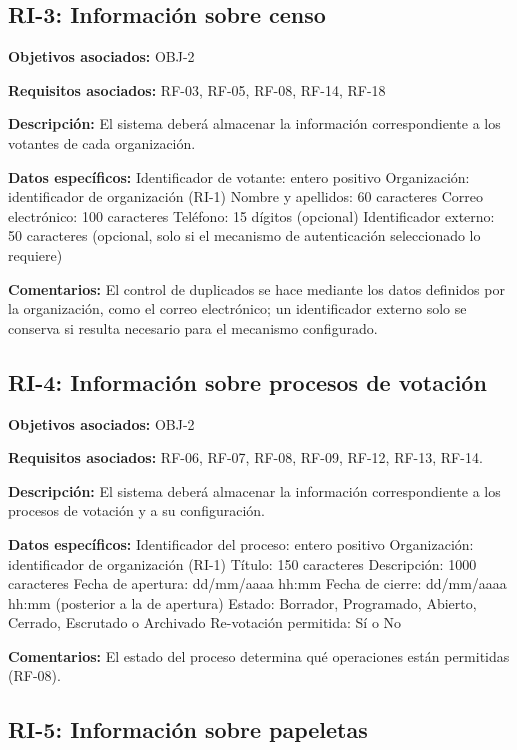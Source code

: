 \subsection{RI-3: Información sobre censo}

\textbf{Objetivos asociados:} OBJ-2\par
\textbf{Requisitos asociados:} RF-03, RF-05, RF-08, RF-14, RF-18\par
\textbf{Descripción:} El sistema deberá almacenar la información correspondiente a los votantes de cada organización.\par
\textbf{Datos específicos:} Identificador de votante: entero positivo Organización: identificador de organización (RI-1) Nombre y apellidos: 60 caracteres Correo electrónico: 100 caracteres Teléfono: 15 dígitos (opcional) Identificador externo: 50 caracteres (opcional, solo si el mecanismo de autenticación seleccionado lo requiere)\par
\textbf{Comentarios:} El control de duplicados se hace mediante los datos definidos por la organización, como el correo electrónico; un identificador externo solo se conserva si resulta necesario para el mecanismo configurado.\par

\subsection{RI-4: Información sobre procesos de votación}

\textbf{Objetivos asociados:} OBJ-2\par
\textbf{Requisitos asociados:} RF-06, RF-07, RF-08, RF-09, RF-12, RF-13, RF-14.\par
\textbf{Descripción:} El sistema deberá almacenar la información correspondiente a los procesos de votación y a su configuración.\par
\textbf{Datos específicos:} Identificador del proceso: entero positivo Organización: identificador de organización (RI-1) Título: 150 caracteres Descripción: 1000 caracteres Fecha de apertura: dd/mm/aaaa hh:mm Fecha de cierre: dd/mm/aaaa hh:mm (posterior a la de apertura) Estado: Borrador, Programado, Abierto, Cerrado, Escrutado o Archivado Re-votación permitida: Sí o No\par
\textbf{Comentarios:} El estado del proceso determina qué operaciones están permitidas (RF-08).\par

\subsection{RI-5: Información sobre papeletas}

